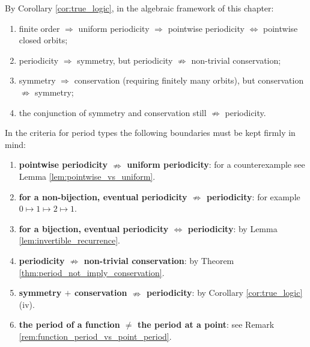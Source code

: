 \begin{corollary}\label{cor:period_symmetry_conservation_logic_review}
By Corollary \ref{cor:true_logic}, in the algebraic framework of this chapter:
\begin{enumerate}[label=(\roman*)]
    \item finite order \(\Rightarrow\) uniform periodicity \(\Rightarrow\) pointwise periodicity \(\iff\) pointwise closed orbits;
    \item periodicity \(\Rightarrow\) symmetry, but periodicity \(\nRightarrow\) non-trivial conservation;
    \item symmetry \(\Rightarrow\) conservation (requiring finitely many orbits), but conservation \(\nRightarrow\) symmetry;
    \item the conjunction of symmetry and conservation still \(\nRightarrow\) periodicity.
\end{enumerate}
\end{corollary}

\begin{remark}\label{rem:period_type_boundaries}
In the criteria for period types the following boundaries must be kept firmly in mind:
\begin{enumerate}[label=(\roman*)]
    \item \textbf{pointwise periodicity \(\nRightarrow\) uniform periodicity}: for a counterexample see Lemma \ref{lem:pointwise_vs_uniform}.
    \item \textbf{for a non-bijection, eventual periodicity \(\nRightarrow\) periodicity}: for example \(0\mapsto 1\mapsto 2\mapsto 1\).
    \item \textbf{for a bijection, eventual periodicity \(\iff\) periodicity}: by Lemma \ref{lem:invertible_recurrence}.
    \item \textbf{periodicity \(\nRightarrow\) non-trivial conservation}: by Theorem \ref{thm:period_not_imply_conservation}.
    \item \textbf{symmetry \(+\) conservation \(\nRightarrow\) periodicity}: by Corollary \ref{cor:true_logic} (iv).
    \item \textbf{the period of a function \(\neq\) the period at a point}: see Remark \ref{rem:function_period_vs_point_period}.
\end{enumerate}
\end{remark}

